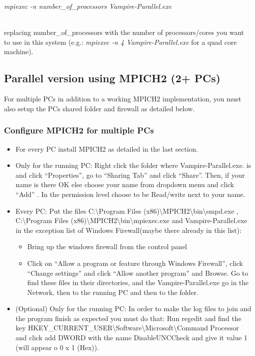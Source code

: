 \begin{minipage}[c]{\textwidth}
\centering
\textit{mpiexec -n number\_of\_processors Vampire-Parallel.exe}
\end{minipage}\\

replacing number\_of\_processors with the number of processors/cores you want to use in this system (e.g.: \textit{mpiexec -n 4 Vampire-Parallel.exe} for a quad core machine).

\subsection*{Parallel version using MPICH2 (2+ PCs)}
For multiple PCs in addition to a working MPICH2 implementation, you must also setup the PCs shared folder and firewall as detailed below. 

\subsubsection{Configure MPICH2 for multiple PCs}
\begin{itemize}
\item For every PC install MPICH2 as detailed in the last section.
\item Only for the running PC: Right click the folder where Vampire-Parallel.exe. is and click ``Properties'', go to ``Sharing Tab'' and click ``Share''. Then, if your name is there OK else choose your name from dropdown menu and click ``Add'' . In  the permission level choose to be Read/write next to your name. 
\item Every PC: Put the files C:\textbackslash Program Files (x86)\textbackslash MPICH2\textbackslash bin\textbackslash smpd.exe ,  C:\textbackslash Program Files (x86)\textbackslash MPICH2\textbackslash bin\textbackslash mpiexec.exe and Vampire-Parallel.exe in the exception list of Windows Firewall(maybe there already in this list):
\begin{itemize}
\item Bring up the windows firewall from the control panel
\item Click on ``Allow a program or feature through Windows Firewall'', click ``Change settings'' and click ``Allow another program'' and Browse. Go to find these files in their directories, and the Vampire-Parallel.exe go in the Network, then to the running PC and then to the folder.
\end{itemize}
\item (Optional) Only for the running PC: In order to make the log files to join and the program finish as expected you must do that: Run regedit and find the key HKEY\_CURRENT\_USER\textbackslash Software\textbackslash Microsoft\textbackslash Command Processor and click add DWORD with the name DisableUNCCheck and give it value 1 (will appear o 0 x 1 (Hex)).
\end{itemize}
